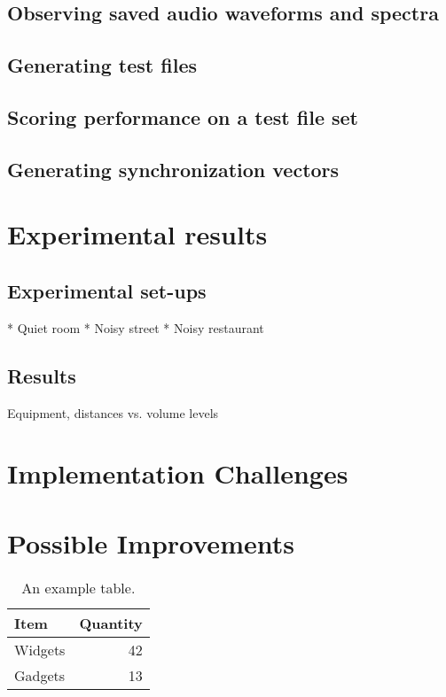 \documentclass[a4paper]{article}
\begin{document}
\subsection{Observing saved audio waveforms and spectra}
\subsection{Generating test files}
\subsection{Scoring performance on a test file set}
\subsection{Generating synchronization vectors}

\section{Experimental results}
\subsection{Experimental set-ups}
* Quiet room
* Noisy street
* Noisy restaurant
\subsection{Results}
Equipment, distances vs. volume levels

\section{Implementation Challenges}

\section{Possible Improvements}

\newpage

\begin{table}
\centering
\begin{tabular}{l|r}
Item & Quantity \\\hline
Widgets & 42 \\
Gadgets & 13
\end{tabular}
\caption{\label{tab:widgets}An example table.}
\end{table}
\end{document}

